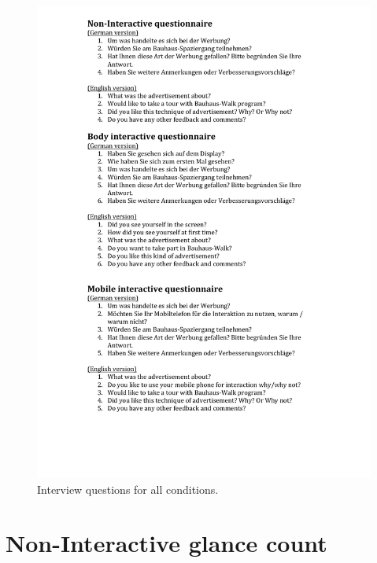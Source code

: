 \begin{appendices}
\begin{figure}[H]
 \centering 
    \includegraphics[width=\textwidth,height=0.8\textheight]{Appendices/8/whole_week_interivew.pdf}
    \caption{Interview questions for all conditions.}
     \label{app:whole_interview}%
\end{figure}


\section{Non-Interactive glance count}


\end{appendices}
